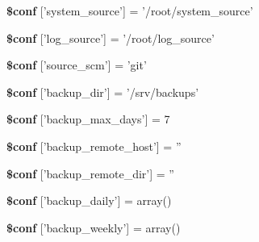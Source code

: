 \begin{DoxyCompactItemize}
\item 
\hypertarget{config__default_8inc_8php_a304fcd3aa6ea041bad6c08150856c3be}{
{\bfseries \$conf} \mbox{[}'system\_\-source'\mbox{]} = '/root/system\_\-source'}
\label{config__default_8inc_8php_a304fcd3aa6ea041bad6c08150856c3be}

\item 
\hypertarget{config__default_8inc_8php_a93ff8361436b0ce6ea219323b4e3a3d3}{
{\bfseries \$conf} \mbox{[}'log\_\-source'\mbox{]} = '/root/log\_\-source'}
\label{config__default_8inc_8php_a93ff8361436b0ce6ea219323b4e3a3d3}

\item 
\hypertarget{config__default_8inc_8php_a75d3e0f59648c80a8571d00e1c14f09c}{
{\bfseries \$conf} \mbox{[}'source\_\-scm'\mbox{]} = 'git'}
\label{config__default_8inc_8php_a75d3e0f59648c80a8571d00e1c14f09c}

\item 
\hypertarget{config__default_8inc_8php_a25cbd042ca8551a8333234327fd68067}{
{\bfseries \$conf} \mbox{[}'backup\_\-dir'\mbox{]} = '/srv/backups'}
\label{config__default_8inc_8php_a25cbd042ca8551a8333234327fd68067}

\item 
\hypertarget{config__default_8inc_8php_ac65f32108921910f7b0a33718600b620}{
{\bfseries \$conf} \mbox{[}'backup\_\-max\_\-days'\mbox{]} = 7}
\label{config__default_8inc_8php_ac65f32108921910f7b0a33718600b620}

\item 
\hypertarget{config__default_8inc_8php_a0701bd383ce65491e9165f6548e7e924}{
{\bfseries \$conf} \mbox{[}'backup\_\-remote\_\-host'\mbox{]} = ''}
\label{config__default_8inc_8php_a0701bd383ce65491e9165f6548e7e924}

\item 
\hypertarget{config__default_8inc_8php_afa49ea5ef4fc45eadb76d3701e1b588e}{
{\bfseries \$conf} \mbox{[}'backup\_\-remote\_\-dir'\mbox{]} = ''}
\label{config__default_8inc_8php_afa49ea5ef4fc45eadb76d3701e1b588e}

\item 
\hypertarget{config__default_8inc_8php_ac7a3799d9bf9c9471b0d5c1ad5ac1f5e}{
{\bfseries \$conf} \mbox{[}'backup\_\-daily'\mbox{]} = array()}
\label{config__default_8inc_8php_ac7a3799d9bf9c9471b0d5c1ad5ac1f5e}

\item 
\hypertarget{config__default_8inc_8php_a2f531ce1145cf635dc527e1010e1ef5a}{
{\bfseries \$conf} \mbox{[}'backup\_\-weekly'\mbox{]} = array()}
\label{config__default_8inc_8php_a2f531ce1145cf635dc527e1010e1ef5a}


\end{DoxyCompactItemize}

